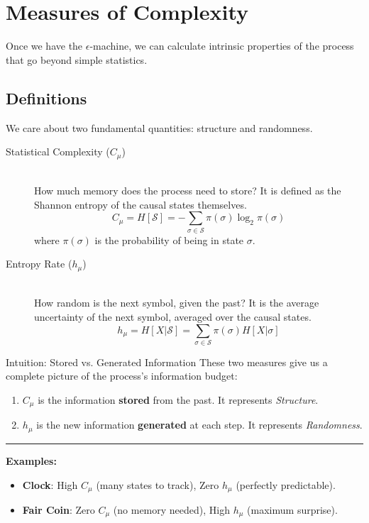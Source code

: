 \section{Measures of Complexity}
\label{sec:measures}

Once we have the $\epsilon$-machine, we can calculate intrinsic properties of the process that go beyond simple statistics.

\subsection{Definitions}
We care about two fundamental quantities: structure and randomness.

\begin{description}
    \item[Statistical Complexity ($C_\mu$)] \hfill \\
    How much memory does the process need to store?
    It is defined as the Shannon entropy of the causal states themselves.
    \begin{equation}
        C_\mu = H[\mathcal{S}] = - \sum_{\sigma \in \mathcal{S}} \pi(\sigma) \log_2 \pi(\sigma)
    \end{equation}
    where $\pi(\sigma)$ is the probability of being in state $\sigma$.

    \item[Entropy Rate ($h_\mu$)] \hfill \\
    How random is the next symbol, given the past?
    It is the average uncertainty of the next symbol, averaged over the causal states.
    \begin{equation}
        h_\mu = H[X|\mathcal{S}] = \sum_{\sigma \in \mathcal{S}} \pi(\sigma) H[X|\sigma]
    \end{equation}
\end{description}

\begin{sidebar}{Intuition: Stored vs. Generated Information}
These two measures give us a complete picture of the process's information budget:
\begin{enumerate}
    \item $C_\mu$ is the information \textbf{stored} from the past. It represents \textit{Structure}.
    \item $h_\mu$ is the new information \textbf{generated} at each step. It represents \textit{Randomness}.
\end{enumerate}

\par\vspace{2mm}\hrule\vspace{2mm}

\textbf{Examples:}
\begin{itemize}
    \item \textbf{Clock}: High $C_\mu$ (many states to track), Zero $h_\mu$ (perfectly predictable).
    \item \textbf{Fair Coin}: Zero $C_\mu$ (no memory needed), High $h_\mu$ (maximum surprise).
\end{itemize}
\end{sidebar}

